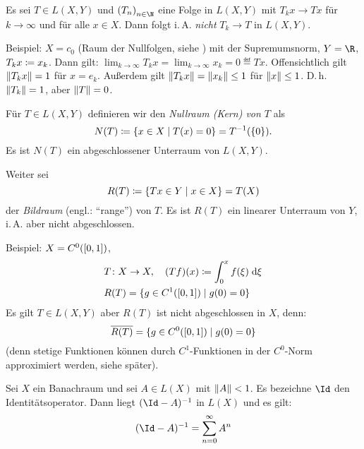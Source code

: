 \begin{thBemerkung}
    Es sei $T\in L(X,Y)$ und $\nSeq T$ eine Folge in $L(X,Y)$ mit $T_k x\to Tx$
    für $k\to\infty$ und für alle $x\in X$. Dann folgt i.\,A. \emph{nicht}
    $T_k\to T$ in $L(X,Y)$.
    
    Beispiel: $X=c_0$ 
    (Raum der Nullfolgen, 
    siehe )
    mit der Supremumsnorm, $Y=\R$, $T_kx\coloneqq x_k$.
    Dann gilt: $\lim_{k\to\infty} T_kx = \lim_{k\to\infty} x_k = 0 \eqdef Tx$.
    Offensichtlich gilt $\lVert T_kx\rVert=1$ für $x=e_k$.
    Außerdem gilt $\lVert T_kx\rVert = \lVert x_k\rVert \leq 1$ für $\lVert x\rVert\leq 1$. D.\,h.
    $\lVert T_k\rVert=1$, aber $\lVert T\rVert=0$.
\end{thBemerkung}

\begin{thDef}
    Für $T\in L(X,Y)$ definieren wir den \emph{Nullraum (Kern) von $T$} als
    \[ N(T) \defeq \{ x\in X \Mid T(x) = 0 \}
        = T^{-1}(\{0\})
    . \]
    Es ist $N(T)$ ein abgeschlossener Unterraum von $L(X,Y)$.
    
    Weiter sei
    \[ R(T) \defeq \{ Tx\in Y \Mid x\in X \} = T(X) \]
    der \emph{Bildraum} (engl.: \enquote{range}) von $T$.
    Es ist $R(T)$ ein linearer Unterraum von $Y$, i.\,A. aber nicht
    abgeschlossen.
    
    Beispiel: $X=C^0([0,1])$,
    \begin{align*}
        &T\colon X\to X, \quad (Tf)(x) \defeq \int_0^x f(\xi) \dif{\xi}
        \\
        &R(T) = \{ g\in C^1(\I) \Mid g(0) = 0 \}
    \end{align*}
    Es gilt $T \in L(X,Y)$ aber $R(T)$ ist nicht abgeschlossen in $X$, denn:
    \[ \setclosure{R(T)} = \{ g\in C^0(\I) \Mid g(0) = 0 \}  \]
    (denn stetige Funktionen können durch $C^1$-Funktionen in der $C^0$-Norm
    approximiert werden, siehe später). %
\end{thDef}

\begin{thSatz} \label{vl04:neumannreihe}
    Sei $X$ ein Banachraum und sei $A\in L(X)$ mit $\lVert A\rVert<1$.
    Es bezeichne $\Id$ den Identitätsoperator.
    Dann liegt $(\Id-A)^{-1}$ in $L(X)$ und es gilt:
    \[ (\Id-A)^{-1} = \nsum[0]^\infty A^n \]
\end{thSatz}


